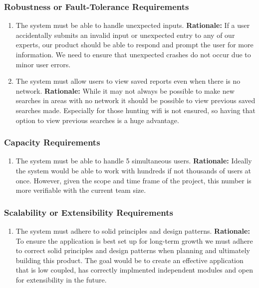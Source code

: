 \documentclass[]{article}
\begin{document}
\subsubsection{Robustness or Fault-Tolerance Requirements}
\label{ssub:robustness_or_fault_tolerance_requirements}
\begin{enumerate}[{PR-RFT}1. ]
	\item The system must be able to handle unexpected inputs. 
	\newline \textbf{Rationale:} If a user accidentally submits an invalid input or unexpected entry to any of our experts, our product should be able to respond and prompt the user for more information. We need to ensure that unexpected crashes do not occur due to minor user errors. 
	\item The system must allow users to view saved reports even when there is no network.
	\newline \textbf{Rationale:} While it may not always be possible to make new searches in areas with no network it should be possible to view previous saved searches made. Especially for those hunting wifi is not ensured, so having that option to view previous searches is a huge advantage. 
\end{enumerate}

\subsubsection{Capacity Requirements}
\label{ssub:capacity_requirements}
\begin{enumerate}[{PR-C}1. ]
	\item The system must be able to handle 5 simultaneous users.
	\newline \textbf{Rationale:} Ideally the system would be able to work with hundreds if not thousands of users at once. However, given the scope and time frame of the project, this number is more verifiable with the current team size. 
\end{enumerate}

\subsubsection{Scalability or Extensibility Requirements}
\label{ssub:scalability_or_extensibility_requirements}
\begin{enumerate}[{PR-SE}1. ]
	\item The system must adhere to solid principles and design patterns.
	\newline \textbf{Rationale:} To ensure the application is best set up for long-term growth we must adhere to correct solid principles and design patterns when planning and ultimately building this product. The goal would be to create an effective application that is low coupled, has correctly implmented independent modules and open for extensibility in the future. 
\end{enumerate}
\end{document}
